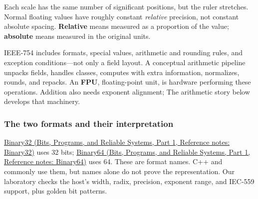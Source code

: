 Each scale has the same number of significant positions, but the ruler stretches. Normal floating values have roughly constant \emph{relative} precision, not constant absolute spacing. \textbf{Relative} means measured as a proportion of the value; \textbf{absolute} means measured in the original units.

IEEE-754 includes formats, special values, arithmetic and rounding rules, and exception conditions---not only a field layout. A conceptual arithmetic pipeline unpacks fields, handles classes, computes with extra information, normalizes, rounds, and repacks. An \textbf{FPU}, floating-point unit, is hardware performing these operations. Addition also needs exponent alignment; The arithmetic story below develops that machinery.

\subsubsection{The two formats and their interpretation}\label{05-engine-i-ch001-the-two-formats-and-their-interpretation}

\hypertarget{05-engine-i-ch001-the-two-formats-and-their-interpretation}{}

\href{../01-Bits-Programs-and-Reliable-Systems-P01/main.pdf\#appendix-5057f9ad327f}{Binary32 (Bits, Programs, and Reliable Systems, Part 1, Reference notes: Binary32)} uses 32 bits; \href{../01-Bits-Programs-and-Reliable-Systems-P01/main.pdf\#appendix-5078dfab64e6}{Binary64 (Bits, Programs, and Reliable Systems, Part 1, Reference notes: Binary64)} uses 64. These are format names. C++  and  commonly use them, but names alone do not prove the representation. Our laboratory checks the host's width, radix, precision, exponent range, and IEC-559 support, plus golden bit patterns.

